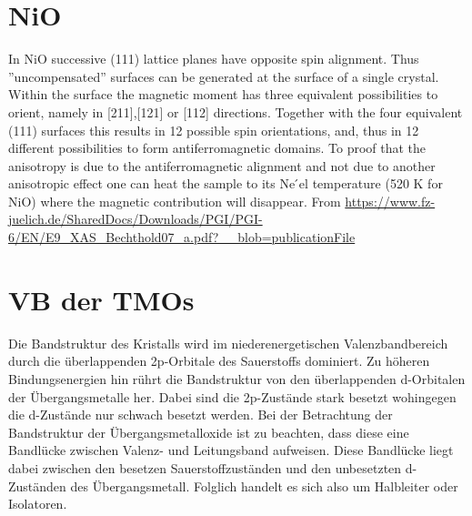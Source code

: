 \section{NiO}
    In NiO successive (111) lattice planes have opposite spin alignment. Thus ”uncompensated”
    surfaces can be generated at the surface of a single crystal. Within the surface the magnetic
    moment has three equivalent possibilities to orient, namely in [211],[121] or [112] directions.
    Together with the four equivalent (111) surfaces this results in 12 possible spin orientations, and,
    thus in 12 different possibilities to form antiferromagnetic domains. To proof that the anisotropy
    is due to the antiferromagnetic alignment and not due to another anisotropic effect one can
    heat the sample to its Ne ́el temperature (520 K for NiO) where the magnetic contribution will
    disappear. From \url{https://www.fz-juelich.de/SharedDocs/Downloads/PGI/PGI-6/EN/E9_XAS_Bechthold07_a.pdf?__blob=publicationFile}

\section{VB der TMOs}
    Die Bandstruktur des Kristalls wird im niederenergetischen Valenzbandbereich durch die überlappenden 2p-Orbitale des Sauerstoffs dominiert.
    Zu höheren Bindungsenergien hin rührt die Bandstruktur von den überlappenden d-Orbitalen der Übergangsmetalle her.
    Dabei sind die 2p-Zustände stark besetzt wohingegen die d-Zustände nur schwach besetzt werden.
    Bei der Betrachtung der Bandstruktur der Übergangsmetalloxide ist zu beachten, dass diese eine Bandlücke zwischen Valenz- und Leitungsband aufweisen.
    Diese Bandlücke liegt dabei zwischen den besetzen Sauerstoffzuständen und den unbesetzten d-Zuständen des Übergangsmetall.
    Folglich handelt es sich also um Halbleiter oder Isolatoren.